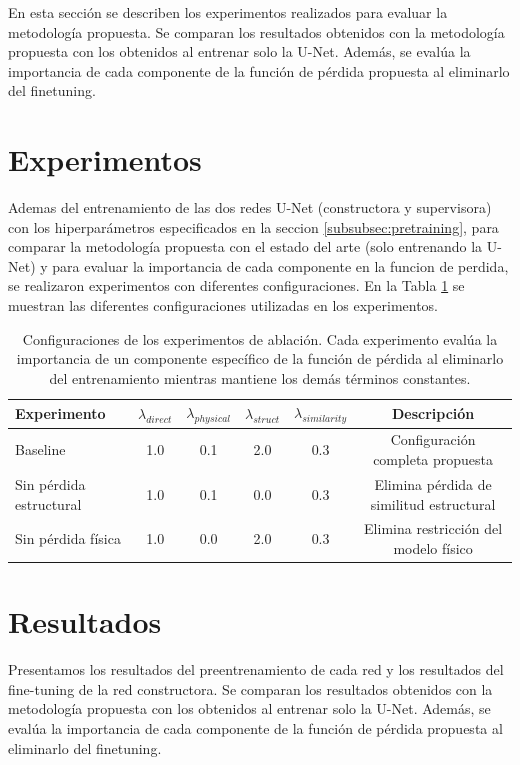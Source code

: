 En esta sección se describen los experimentos realizados para evaluar la metodología propuesta. Se comparan los resultados obtenidos con la metodología propuesta con los obtenidos al entrenar solo la U-Net. Además, se evalúa la importancia de cada componente de la función de pérdida propuesta al eliminarlo del finetuning.


\section{Experimentos}
Ademas del entrenamiento de las dos redes U-Net (constructora y supervisora) con los hiperparámetros especificados en la seccion \ref{subsubsec:pretraining}, para comparar la metodología propuesta con el estado del arte (solo entrenando la U-Net) y para evaluar la importancia de cada componente en la funcion de perdida, se realizaron experimentos con diferentes configuraciones. En la Tabla \ref{tab:experiments} se muestran las diferentes configuraciones utilizadas en los experimentos.

\begin{table}[H]
    \centering
    \begin{tabular}{lccccc}
    \hline
    \textbf{Experimento} & $\lambda_{direct}$ & $\lambda_{physical}$ & $\lambda_{struct}$ & $\lambda_{similarity}$ & \textbf{Descripción} \\
    \hline
    Baseline & 1.0 & 0.1 & 2.0 & 0.3 & Configuración completa propuesta \\
    Sin pérdida estructural & 1.0 & 0.1 & 0.0 & 0.3 & Elimina pérdida de similitud estructural \\
    Sin pérdida física & 1.0 & 0.0 & 2.0 & 0.3 & Elimina restricción del modelo físico \\
    \hline
    \end{tabular}
    \caption{Configuraciones de los experimentos de ablación. Cada experimento evalúa la importancia de un componente específico de la función de pérdida al eliminarlo del entrenamiento mientras mantiene los demás términos constantes.}
    \label{tab:experiments}
\end{table}

\section{Resultados}

Presentamos los resultados del preentrenamiento de cada red y los resultados del fine-tuning de la red constructora. Se comparan los resultados obtenidos con la metodología propuesta con los obtenidos al entrenar solo la U-Net. Además, se evalúa la importancia de cada componente de la función de pérdida propuesta al eliminarlo del finetuning.

